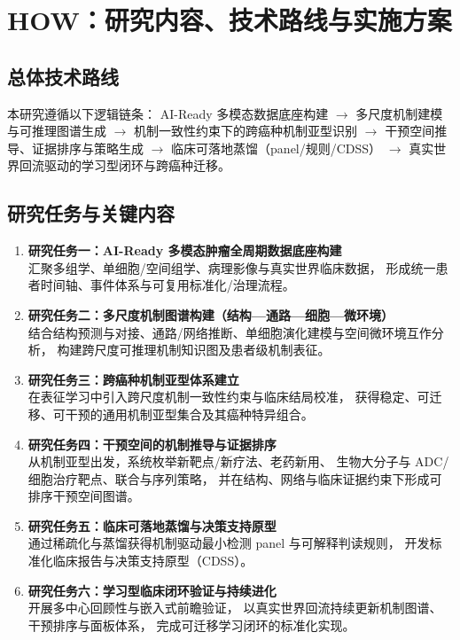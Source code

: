 \documentclass[12pt,a4paper,fontset=mac]{ctexart}
\begin{document}
\section{HOW：研究内容、技术路线与实施方案}

\subsection{总体技术路线}
本研究遵循以下逻辑链条：
AI-Ready 多模态数据底座构建
$\rightarrow$ 多尺度机制建模与可推理图谱生成
$\rightarrow$ 机制一致性约束下的跨癌种机制亚型识别
$\rightarrow$ 干预空间推导、证据排序与策略生成
$\rightarrow$ 临床可落地蒸馏（panel/规则/CDSS）
$\rightarrow$ 真实世界回流驱动的学习型闭环与跨癌种迁移。

\subsection{研究任务与关键内容}
\begin{enumerate}[leftmargin=2em]
  \item \textbf{研究任务一：AI-Ready 多模态肿瘤全周期数据底座构建}\\
        汇聚多组学、单细胞/空间组学、病理影像与真实世界临床数据，
        形成统一患者时间轴、事件体系与可复用标准化/治理流程。
  \item \textbf{研究任务二：多尺度机制图谱构建（结构—通路—细胞—微环境）}\\
        结合结构预测与对接、通路/网络推断、单细胞演化建模与空间微环境互作分析，
        构建跨尺度可推理机制知识图及患者级机制表征。
  \item \textbf{研究任务三：跨癌种机制亚型体系建立}\\
        在表征学习中引入跨尺度机制一致性约束与临床结局校准，
        获得稳定、可迁移、可干预的通用机制亚型集合及其癌种特异组合。
  \item \textbf{研究任务四：干预空间的机制推导与证据排序}\\
        从机制亚型出发，系统枚举新靶点/新疗法、老药新用、
        生物大分子与 ADC/细胞治疗靶点、联合与序列策略，
        并在结构、网络与临床证据约束下形成可排序干预空间图谱。
  \item \textbf{研究任务五：临床可落地蒸馏与决策支持原型}\\
        通过稀疏化与蒸馏获得机制驱动最小检测 panel 与可解释判读规则，
        开发标准化临床报告与决策支持原型（CDSS）。
  \item \textbf{研究任务六：学习型临床闭环验证与持续进化}\\
        开展多中心回顾性与嵌入式前瞻验证，
        以真实世界回流持续更新机制图谱、干预排序与面板体系，
        完成可迁移学习闭环的标准化实现。
\end{enumerate}
\end{document}
